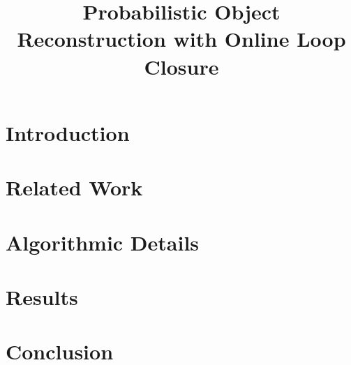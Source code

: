 \documentclass{bmvc2k}
\title{Probabilistic Object Reconstruction with Online Loop Closure}
\begin{document}
\maketitle

\begin{abstract}

\end{abstract}

\section{Introduction}
\label{sec:introduction}


\section{Related Work}
\label{sec:lit_review}


\section{Algorithmic Details}



\section{Results}
\label{sec:results}


\vspace{-\baselineskip}

\section{Conclusion}
\label{sec:discussion}



\end{document}

